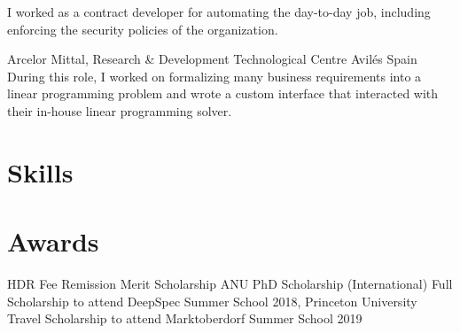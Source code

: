 \documentclass[11pt,a4paper,sans]{moderncv}        %
\begin{document}
{I worked as a contract developer for automating the day-to-day job, including enforcing the security policies of the organization.}

 {Arcelor Mittal, Research \& Development Technological Centre} {Avil{\'e}s} {Spain} 
{During this role, I worked on formalizing many business requirements into a linear programming problem and wrote a 
 custom interface that interacted with their in-house linear programming solver.}



\section{Skills}




\section{Awards}
\cvitem{} {HDR Fee Remission Merit Scholarship}
\cvitem{} {ANU PhD Scholarship (International)}
\cvitem{} {Full Scholarship to attend DeepSpec Summer School 2018, Princeton University}
\cvitem{} {Travel Scholarship to attend Marktoberdorf Summer School 2019}
\end{document}
